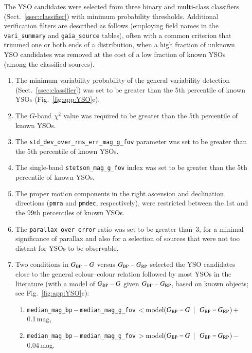\documentclass[longauth]{aa}
\def\g{$G$\xspace}
\def\bprp{\mbox{$G_{\rm BP}-G_{\rm RP}$}\xspace}
\def\bpg{\mbox{$G_{\rm BP}-G$}\xspace}
\begin{document}
The YSO candidates were selected from three binary and multi-class classifiers (Sect.~\ref{ssec:classifier}) with minimum probability thresholds. Additional verification filters are described as follows (employing field names in the \texttt{vari\_summary} and \texttt{gaia\_source} tables), often with a common criterion that trimmed one or both ends of a distribution, when a high fraction of unknown YSO candidates was removed at the cost of a low fraction of known YSOs (among the classified sources).
\begin{enumerate}
    \item The minimum variability probability of the general variability detection (Sect.~\ref{ssec:classifier}) was set to be greater than the 5th percentile of known YSOs (Fig.~\ref{fig:app:YSO}e).
    \item The \g-band $\chi^2$ value was required to be greater than the 5th percentile of known YSOs.
    \item The \texttt{std\_dev\_over\_rms\_err\_mag\_g\_fov} parameter was set to be greater than the 5th percentile of known YSOs.
    \item The single-band \texttt{stetson\_mag\_g\_fov} index was set to be greater than the 5th percentile of known YSOs.
    \item The proper motion components in the right ascension and declination directions (\texttt{pmra} and \texttt{pmdec}, respectively), were restricted between the 1st and the 99th percentiles of known YSOs.
    \item The \texttt{parallax\_over\_error} ratio was set to be greater than~3, for a minimal significance of parallax and also for a selection of sources that were not too distant for YSOs to be observable.
    \item Two conditions in \bpg versus \bprp selected the YSO candidates close to the general colour--colour relation followed by most YSOs in the literature (with a model of \bpg given \bprp, based on known objects; see Fig.~\ref{fig:app:YSO}c): 
    \begin{enumerate}
        \item \texttt{median\_mag\_bp}\,$-$\,\texttt{median\_mag\_g\_fov}\,$<$\break model(\bpg~|~\bprp)\,$+$\,0.1\,mag,
        \item \texttt{median\_mag\_bp}\,$-$\,\texttt{median\_mag\_g\_fov}\,$>$\break model(\bpg~|~\bprp)\,$-$\,0.04\,mag.
    \end{enumerate}
\end{enumerate}
\end{document}
